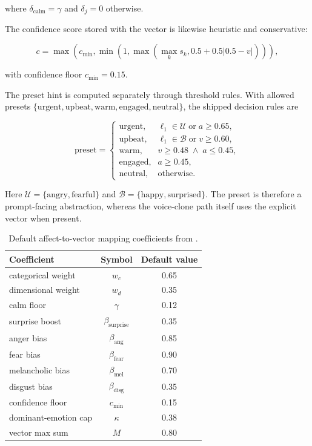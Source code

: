 where \(\delta_{\text{calm}}=\gamma\) and \(\delta_j=0\) otherwise.

The confidence score stored with the vector is likewise heuristic and conservative:

\begin{equation}
c = \max\left(c_{\min}, \min\left(1, \max\left(\max_k s_k, 0.5 + 0.5|0.5-v|\right)\right)\right),
\end{equation}

with confidence floor \(c_{\min}=0.15\).

The preset hint is computed separately through threshold rules. With allowed presets \(\{\text{urgent}, \text{upbeat}, \text{warm}, \text{engaged}, \text{neutral}\}\), the shipped decision rules are

\begin{equation}
\text{preset} =
\begin{cases}
\text{urgent}, & \ell_1 \in \mathcal{U} \; \text{or} \; a \ge 0.65, \\
\text{upbeat}, & \ell_1 \in \mathcal{B} \; \text{or} \; v \ge 0.60, \\
\text{warm}, & v \ge 0.48 \; \wedge \; a \le 0.45, \\
\text{engaged}, & a \ge 0.45, \\
\text{neutral}, & \text{otherwise.}
\end{cases}
\end{equation}

Here \(\mathcal{U}=\{\text{angry},\text{fearful}\}\) and \(\mathcal{B}=\{\text{happy},\text{surprised}\}\). The preset is therefore a prompt-facing abstraction, whereas the voice-clone path itself uses the explicit vector when present.

\begin{table}[H]
\centering
\small
\begin{tabular}{lcc}
\toprule
Coefficient & Symbol & Default value \\
\midrule
categorical weight & \(w_c\) & 0.65 \\
dimensional weight & \(w_d\) & 0.35 \\
calm floor & \(\gamma\) & 0.12 \\
surprise boost & \(\beta_{\text{surprise}}\) & 0.35 \\
anger bias & \(\beta_{\text{ang}}\) & 0.85 \\
fear bias & \(\beta_{\text{fear}}\) & 0.90 \\
melancholic bias & \(\beta_{\text{mel}}\) & 0.70 \\
disgust bias & \(\beta_{\text{disg}}\) & 0.35 \\
confidence floor & \(c_{\min}\) & 0.15 \\
dominant-emotion cap & \(\kappa\) & 0.38 \\
vector max sum & \(M\) & 0.80 \\
\bottomrule
\end{tabular}
\caption{Default affect-to-vector mapping coefficients from .}
\label{tab:affect-coeffs}
\end{table}

